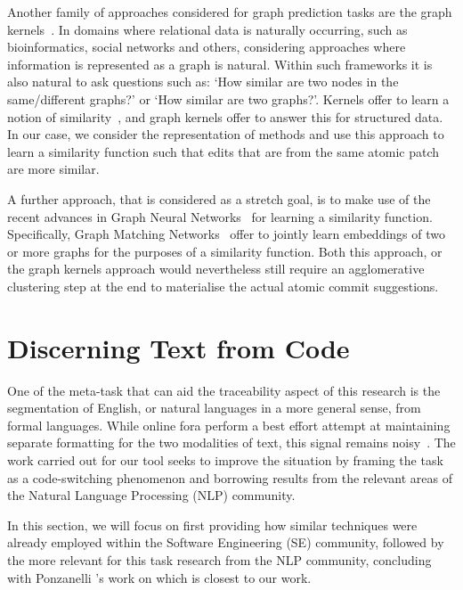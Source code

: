 Another family of approaches considered for graph prediction tasks are the graph
kernels~\cite{vishwanathan2010graph}. In domains where relational data is
naturally occurring, such as bioinformatics, social networks and others,
considering approaches where information is represented as a graph is natural.
Within such frameworks it is also natural to ask questions such as: `How similar
are two nodes in the same/different graphs?' or `How similar are two graphs?'.
Kernels offer to learn a notion of similarity~\cite{smola1998learning}, and
graph kernels offer to answer this for structured data. In our case, we consider
the \deltaPDGN representation of methods and use this approach to learn a
similarity function such that edits that are from the same atomic patch are more
similar.

A further approach, that is considered as a stretch goal, is to make use of the
recent advances in Graph Neural Networks~\cite{scarselli2008graph} for learning
a similarity function. Specifically, Graph Matching
Networks~\cite{DBLP:journals/corr/abs-1904-12787} offer to jointly learn
embeddings of two or more graphs for the purposes of a similarity function. Both
this approach, or the graph kernels approach would nevertheless still require an
agglomerative clustering step at the end to materialise the actual atomic commit
suggestions.

\section{Discerning Text from Code}
\label{chapter:literature:sec:posit_rel_work}

One of the meta-task that can aid the traceability aspect of this research is
the segmentation of English, or natural languages in a more general sense, from
formal languages. While online fora perform a best effort attempt at maintaining
separate formatting for the two modalities of text, this signal remains
noisy~\cite{ponzanelli2014improving}. The work carried out for our tool seeks to
improve the situation by framing the task as a code-switching phenomenon and
borrowing results from the relevant areas of the Natural Language Processing
(NLP) community.

In this section, we will focus on first providing how similar techniques were
already employed within the Software Engineering (SE) community, followed by the
more relevant for this task research from the NLP community, concluding with
Ponzanelli \etal's work on \SO which is closest to our work.

